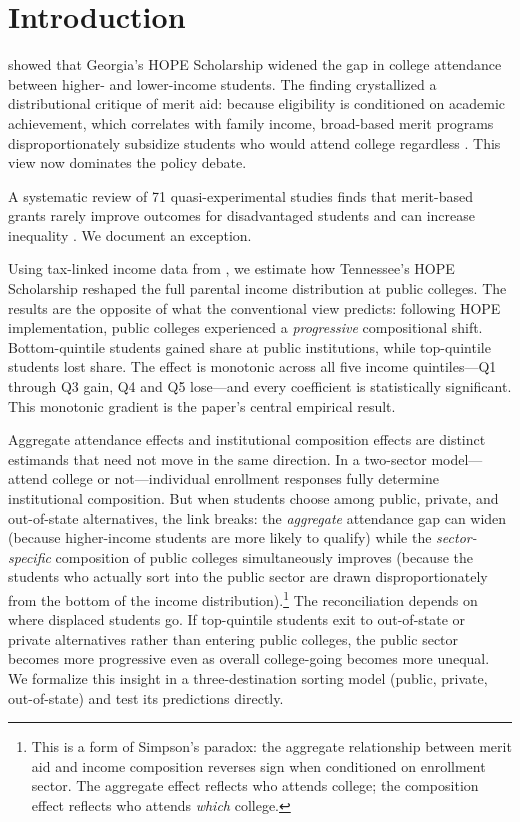 
\section{Introduction}

\textcite{dynarski2000hope} showed that Georgia's HOPE Scholarship
widened the gap in college attendance between higher- and lower-income
students. The finding crystallized a distributional critique of merit
aid: because eligibility is conditioned on academic achievement, which
correlates with family income, broad-based merit programs
disproportionately subsidize students who would attend college regardless
\parencite{dynarski2004merit, jones2022merit}. This view now dominates
the policy debate.

A systematic review of 71 quasi-experimental studies finds that
merit-based grants rarely improve outcomes for disadvantaged students and
can increase inequality \parencite{herbaut2020works}. We document an
exception.

Using tax-linked income data from \textcite{chetty2020mobility}, we
estimate how Tennessee's HOPE Scholarship reshaped the full parental
income distribution at public colleges. The results are the opposite of
what the conventional view predicts: following HOPE implementation,
public colleges experienced a \emph{progressive} compositional shift.
Bottom-quintile students gained share at public institutions, while
top-quintile students lost share. The effect is monotonic across all
five income quintiles---Q1 through Q3 gain, Q4 and Q5 lose---and every
coefficient is statistically significant. This monotonic gradient is the
paper's central empirical result.

Aggregate attendance effects and institutional composition effects are
distinct estimands that need not move in the same direction. In a
two-sector model---attend college or not---individual enrollment
responses fully determine institutional composition. But when students
choose among public, private, and out-of-state alternatives, the link
breaks: the \emph{aggregate} attendance gap can widen (because
higher-income students are more likely to qualify) while the
\emph{sector-specific} composition of public colleges simultaneously
improves (because the students who actually sort into the public sector
are drawn disproportionately from the bottom of the income
distribution).\footnote{This is a form of Simpson's paradox: the
aggregate relationship between merit aid and income composition reverses
sign when conditioned on enrollment sector. The aggregate effect reflects
who attends college; the composition effect reflects who attends
\emph{which} college.} The reconciliation depends on where displaced
students go. If top-quintile students exit to out-of-state or private
alternatives rather than entering public colleges, the public sector
becomes more progressive even as overall college-going becomes more
unequal. We formalize this insight in a three-destination sorting model
(public, private, out-of-state) and test its predictions directly.

